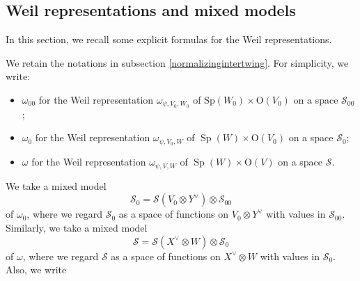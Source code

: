 \documentclass[article]{article}
\numberwithin{equation}{section}
\theoremstyle{definition}
\begin{document}
\subsection{Weil representations and mixed models}\label{mixed model}
In this section, we recall some explicit formulas for the Weil representations. 
\begin{comment}
Let $\mathbb W$ be a finite dimensional vector space equipped with a non-degenerate symplectic form $\langle\cdot, \cdot\rangle _{\mathbb W}: \mathbb W\times \mathbb W \rightarrow F$. Let  $\mathcal{H}(\mathbb W)=\mathbb W \oplus F$ be the associated Heisenberg group, i.e., the multiplication law is given by
$$(w, t) \cdot\left(w^{\prime}, t^{\prime}\right)=\left(w+w^{\prime}, t+t^{\prime}+\frac{1}{2}\left\langle w, w^{\prime}\right\rangle_{\mathbb W}\right)$$
for $w, w^{\prime} \in W$ and $t, t^{\prime} \in F$. Fix a maximal totally isotropic subspaces $\mathbb X$ and $\mathbb X^\vee$ such that $\mathbb W=\mathbb X\oplus \mathbb X^\vee$. Let $\rho$ be the Heisenberg representation of $\mathcal H(\mathbb W)$ on $\mathscr S(\mathbb X^\vee)$ with central character $\psi$. Namely,
$$\rho\left(x+x^{\prime}, t\right) \varphi\left(x_0^\prime\right)=\psi\left(t+\left\langle x_0, x\right\rangle_{\mathbb W}+\frac{1}{2}\left\langle x^{\prime}, x\right\rangle_{\mathbb W}\right) \varphi\left(x_0^\prime+x^{\prime}\right)$$
for $\varphi \in \mathscr{S}(\mathbb X^\vee), x \in \mathbb X, x^{\prime}, x_0^\prime \in \mathbb X^\vee$ and $t \in F$. 
\end{comment}
We retain the notations in subsection \ref{normalizingintertwing}.  For simplicity, we write:
\begin{itemize}
	\item  $\omega_{00}$ for the Weil representation $\omega_{\psi, V_0, W_0}$ of $\mathrm{Sp}(W_0) \times \mathrm{O}(V_0)$ on a space $\mathscr{S}_{00}$;
	\item $\omega_{0}$ for the Weil representation $\omega_{\psi, V_0, W}$ of $\operatorname{Sp}(W) \times \mathrm{O}\left(V_0\right)$ on a space $\mathscr{S}_{0}$;
	\item $\omega$ for the Weil representation $\omega_{\psi, V, W}$ of $\operatorname{Sp}\left(W\right) \times \mathrm{O}\left(V\right)$ on a space $\mathscr{S}$.
\end{itemize}
We take a mixed model 
$$\mathscr{S}_0=\mathscr{S}\left(V_0\otimes Y^\vee\right)\otimes\mathscr{S}_{00} $$
of $\omega_0$, where we regard $\mathscr{S}_0$ as a space of functions on $V_0 \otimes Y^\vee$ with values in $\mathscr{S}_{00}$. Similarly, we take a mixed model 
$$\mathscr{S}=\mathscr{S}\left(X^\vee \otimes W\right) \otimes \mathscr{S}_0$$
of $\omega$, where we regard $\mathscr{S}$ as a space of functions on $X^\vee\otimes W$ with values in $\mathscr{S}_0$. Also, we write 
\end{document}
